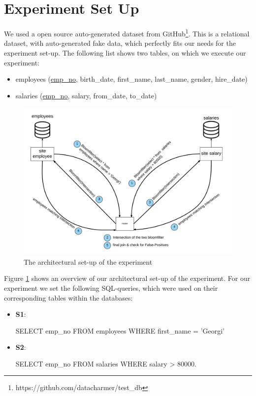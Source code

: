 \documentclass[12]{scrartcl}
\begin{document}
\section{Experiment Set Up}
We used a open source auto-generated dataset from GitHub\footnote{https://github.com/datacharmer/test\_db}. This is a relational dataset, with auto-generated fake data, which perfectly fits our needs for the experiment set-up. The following list shows two tables, on which we execute our experiment: 
\begin{itemize}
	\item employees (\uline{emp\_no}, birth\_date, first\_name, last\_name, gender, hire\_date)
	\item salaries (\uline{emp\_no}, salary, from\_date, to\_date)
\end{itemize}

\begin{figure}[ht]
	\begin{center}
		\includegraphics[scale=0.1]{res/architecture.png}
	\end{center}
	\caption{The architectural set-up of the experiment}
	\label{fig:architecture}
\end{figure}

Figure \ref{fig:architecture} shows an overview of our architectural set-up of the experiment. For our experiment we set the following SQL-queries, which were used on their corresponding tables within the databases:

\begin{itemize}
	\item[]  \textbf{S1}: \begin{verb}
	SELECT emp_no FROM employees WHERE first_name = 'Georgi'
	\end{verb}
	\item[]  \textbf{S2}: \begin{verb}
		SELECT emp_no FROM salaries WHERE salary > 80000.
	\end{verb}
\end{itemize}
\end{document}
